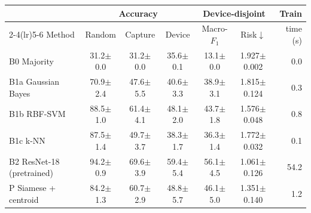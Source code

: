 \begin{tabular}{@{}lcccccr@{}}
\toprule
 & \multicolumn{3}{c}{Accuracy} & \multicolumn{2}{c}{Device-disjoint} & Train \\
\cmidrule(lr){2-4}\cmidrule(lr){5-6}
Method & Random & Capture & Device & Macro-$F_1$ & Risk$\downarrow$ & time (s) \\
\midrule
B0 Majority & 31.2$\pm$0.0 & 31.2$\pm$0.0 & 35.6$\pm$0.1 & 13.1$\pm$0.0 & 1.927$\pm$0.002 & 0.0 \\
B1a Gaussian Bayes & 70.9$\pm$2.4 & 47.6$\pm$5.5 & 40.6$\pm$3.3 & 38.9$\pm$3.1 & 1.815$\pm$0.124 & 0.3 \\
B1b RBF-SVM & 88.5$\pm$1.0 & 61.4$\pm$4.1 & 48.1$\pm$2.0 & 43.7$\pm$1.8 & 1.576$\pm$0.048 & 0.8 \\
B1c k-NN & 87.5$\pm$1.4 & 49.7$\pm$3.7 & 38.3$\pm$1.7 & 36.3$\pm$1.4 & 1.772$\pm$0.032 & 0.1 \\
B2 ResNet-18 (pretrained) & 94.2$\pm$0.9 & 69.6$\pm$3.9 & 59.4$\pm$5.4 & 56.1$\pm$4.5 & 1.061$\pm$0.126 & 54.2 \\
P  Siamese + centroid & 84.2$\pm$1.3 & 60.7$\pm$2.9 & 48.8$\pm$5.7 & 46.1$\pm$5.0 & 1.351$\pm$0.140 & 1.2 \\
\bottomrule
\end{tabular}
